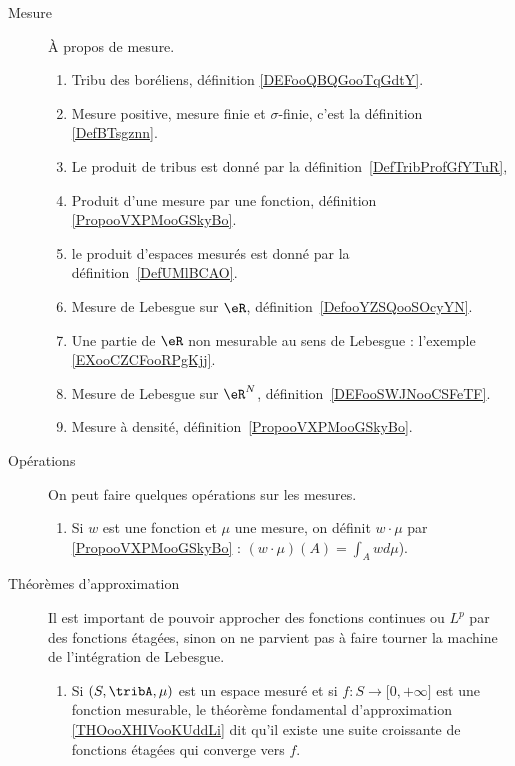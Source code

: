        \label{THEMEooKLVRooEqecQk}
\begin{description}
	\item[Mesure]
		À propos de mesure.
		\begin{enumerate}
			\item
			      Tribu des boréliens, définition \ref{DEFooQBQGooTqGdtY}.
			\item
			      Mesure positive, mesure finie et \( \sigma\)-finie, c'est la définition \ref{DefBTsgznn}.

			\item Le produit de tribus est donné par la définition~\ref{DefTribProfGfYTuR},     %
			\item
			      Produit d'une mesure par une fonction, définition \ref{PropooVXPMooGSkyBo}.
			\item le produit d'espaces mesurés est donné par la définition~\ref{DefUMlBCAO}.     %
			\item
			      Mesure de Lebesgue sur \( \eR\), définition~\ref{DefooYZSQooSOcyYN}.
			\item
			      Une partie de \( \eR\) non mesurable au sens de Lebesgue : l'exemple \ref{EXooCZCFooRPgKjj}.
			\item
			      Mesure de Lebesgue sur \( \eR^N\), définition~\ref{DEFooSWJNooCSFeTF}.
			\item
			      Mesure à densité, définition~\ref{PropooVXPMooGSkyBo}.
		\end{enumerate}
	\item[Opérations]
		On peut faire quelques opérations sur les mesures.
		\begin{enumerate}
			\item
			      Si \( w\) est une fonction et \( \mu\) une mesure, on définit \( w\cdot \mu  \) par \ref{PropooVXPMooGSkyBo} : \( (w\cdot \mu)(A)=\int_Awd\mu\)).
		\end{enumerate}
	\item[Théorèmes d'approximation]
		Il est important de pouvoir approcher des fonctions continues ou \( L^p\) par des fonctions étagées, sinon on ne parvient pas à faire tourner la machine de l'intégration de Lebesgue.
		\begin{enumerate}
			\item
			      Si \( (S,\tribA, \mu)\) est un espace mesuré et si \( f\colon S\to \mathopen[ 0 , +\infty \mathclose]\) est une fonction mesurable, le théorème fondamental d'approximation \ref{THOooXHIVooKUddLi} dit qu'il existe une suite croissante de fonctions étagées qui converge vers \( f\).

\end{enumerate}
\end{description}
